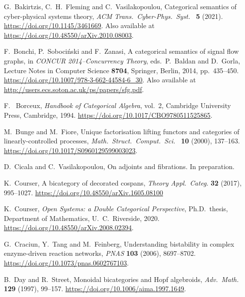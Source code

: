 \documentclass[a4paper,onecolumn, superscriptaddress,10pt, accepted=2022-03-25, issue=SS, volume=VV, shorttitle=papers/compositionality-VV-SS]{compositionalityarticle}
\begin{document}
\begin{thebibliography}{100}
 G.\ Bakirtzis, C.\ H.\ Fleming and C.\ Vasilakopoulou, Categorical semantics of cyber-physical systems theory, \textsl{ACM Trans.\ 
Cyber-Phys.\ Syst.\ } \textbf{5} (2021). \href{https://doi.org/10.1145/3461669}{https://doi.org/10.1145/3461669}.   Also available at \href{https://doi.org/10.48550/arXiv.2010.08003}{https://doi.org/10.48550/arXiv.2010.08003}.

 F.\ Bonchi, P.\ Soboci\'nski and F.\ Zanasi, A categorical semantics of signal flow graphs, in \textsl{CONCUR 2014--Concurrency Theory}, 
eds.\ P.\ Baldan and D.\ Gorla, Lecture Notes in Computer Science \textbf{8704}, Springer, Berlin, 2014, pp.\ 435--450. 
\href{https://doi.org/10.1007/978-3-662-44584-6\_30}{https://doi.org/10.1007/978-3-662-44584-6\_30}.  Also available at 
\href{http://users.ecs.soton.ac.uk/ps/papers/sfg.pdf}{http://users.ecs.soton.ac.uk/ps/papers/sfg.pdf}.

 F. \ Borceux, \textsl{Handbook of Categorical Algebra}, vol.\ 2, 
Cambridge University Press, Cambridge, 1994. \href{https://doi.org/10.1017/CBO9780511525865}{https://doi.org/10.1017/CBO9780511525865}.

 M.\ Bunge and M.\ Fiore, Unique factorisation lifting functors and categories of linearly-controlled processes, \textsl{Math.\ 
Struct.\ Comput.\ Sci.\ } \textbf{10} (2000), 137--163. \href{https://doi.org/10.1017/S0960129599003023}{https://doi.org/10.1017/S0960129599003023}.

\bibitem{CV} D.\ Cicala and C.\ Vasilakopoulou, On adjoints and fibrations. In preparation.

\bibitem{Courser} K.\ Courser, A bicategory of decorated cospans, \textsl{Theory Appl.\ Categ.} \textbf{32} (2017), 995--1027.  \href{https://doi.org/10.48550/arXiv.1605.08100}{https://doi.org/10.48550/arXiv.1605.08100}

\bibitem{CourserThesis} K.\ Courser, \textsl{Open Systems: a Double Categorical Perspective}, Ph.D.\ thesis, Department of Mathematics, U.\ C.\ Riverside, 2020.  
\href{https://doi.org/10.48550/arXiv.2008.02394}{https://doi.org/10.48550/arXiv.2008.02394}.

\bibitem{CTF} G.\ Craciun, Y.\ Tang and M.\ Feinberg, Understanding bistability in complex enzyme-driven reaction networks, \textsl{PNAS} \textbf{103} 
(2006), 8697--8702. \href{https://doi.org/10.1073/pnas.0602767103}{https://doi.org/10.1073/pnas.0602767103}. 

\bibitem{DS} B.\ Day and R.\ Street, Monoidal bicategories and Hopf algebroids, \textsl{Adv.\ Math.} \textbf{129} (1997), 99--157. 
\href{https://doi.org/10.1006/aima.1997.1649}{https://doi.org/10.1006/aima.1997.1649}.


\end{thebibliography}
\end{document}
